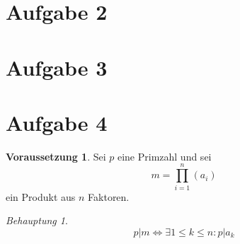 \documentclass{article}
\newcommand*{\7}{\textbackslash}
\theoremstyle{remark}
\newtheorem*{Behauptung}{Behauptung}
\theoremstyle{definition}
\newtheorem*{Voraussetzung}{Voraussetzung}
\begin{document}
	\section*{Aufgabe 2}

	\section*{Aufgabe 3}

	\section*{Aufgabe 4}
	
	\begin{Voraussetzung}
		Sei $p$ eine Primzahl und sei \[m=\prod_{i=1}^n(a_i)\] ein Produkt aus $n$ Faktoren.
	\end{Voraussetzung}

	\begin{Behauptung}
		\[p|m\Leftrightarrow\exists 1\leq{k}\leq{n}:p|a_k\]
	\end{Behauptung}
\end{document}
